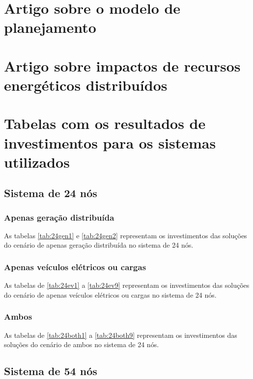 
\chapter{Artigo sobre o modelo de planejamento}
\label{sec:paperPESD}


\chapter{Artigo sobre impactos de recursos energéticos distribuídos}
\label{sec:paperDER}



\chapter{Tabelas com os resultados de investimentos para os sistemas utilizados}

\section{Sistema de 24 nós}
\label{sec:tab24}

\subsection{Apenas geração distribuída}
As tabelas \ref{tab:24gen1} e \ref{tab:24gen2} representam os investimentos das soluções do cenário de apenas geração distribuída no sistema de 24 nós.


\subsection{Apenas veículos elétricos ou cargas}
As tabelas de \ref{tab:24ev1} a \ref{tab:24ev9} representam os investimentos das soluções do cenário de apenas veículos elétricos ou cargas no sistema de 24 nós.


\subsection{Ambos}
As tabelas de \ref{tab:24both1} a \ref{tab:24both9} representam os investimentos das soluções do cenário de ambos no sistema de 24 nós.


\newpage
\section{Sistema de 54 nós}
\label{sec:tab54}

